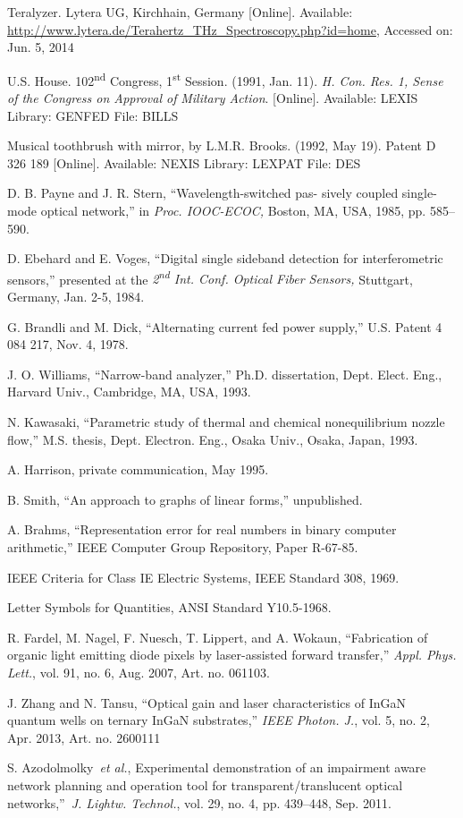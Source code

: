 \documentclass{ieeeaccess}
\begin{document}
\begin{thebibliography}{00}
 Teralyzer. Lytera UG, Kirchhain, Germany [Online].
Available:
\underline{http://www.lytera.de/Terahertz\_THz\_Spectroscopy.php?id=home}, Accessed on: Jun. 5, 2014

 U.S. House. 102\textsuperscript{nd} Congress, 1\textsuperscript{st} Session. (1991, Jan. 11). \emph{H. Con. Res. 1, Sense of the Congress on Approval of}  \emph{Military Action}. [Online]. Available: LEXIS Library: GENFED File: BILLS

 Musical toothbrush with mirror, by L.M.R. Brooks. (1992, May 19). Patent D 326 189 [Online]. Available: NEXIS Library: LEXPAT File: DES

 D. B. Payne and J. R. Stern, ``Wavelength-switched pas- sively coupled single-mode optical network,'' in \emph{Proc. IOOC-ECOC,} Boston, MA, USA, 1985, pp. 585--590.

 D. Ebehard and E. Voges, ``Digital single sideband detection for interferometric sensors,'' presented at the \emph{2\textsuperscript{nd} Int. Conf. Optical Fiber Sensors,} Stuttgart, Germany, Jan. 2-5, 1984.

 G. Brandli and M. Dick, ``Alternating current fed power supply,'' U.S. Patent 4 084 217, Nov. 4, 1978.

 J. O. Williams, ``Narrow-band analyzer,'' Ph.D. dissertation, Dept. Elect. Eng., Harvard Univ., Cambridge, MA, USA, 1993.

 N. Kawasaki, ``Parametric study of thermal and chemical nonequilibrium nozzle flow,'' M.S. thesis, Dept. Electron. Eng., Osaka Univ., Osaka, Japan, 1993.

 A. Harrison, private communication, May 1995.

 B. Smith, ``An approach to graphs of linear forms,'' unpublished.

 A. Brahms, ``Representation error for real numbers in binary computer arithmetic,'' IEEE Computer Group Repository, Paper R-67-85.

 IEEE Criteria for Class IE Electric Systems, IEEE Standard 308, 1969.

 Letter Symbols for Quantities, ANSI Standard Y10.5-1968.

 R. Fardel, M. Nagel, F. Nuesch, T. Lippert, and A. Wokaun, ``Fabrication of organic light emitting diode pixels by laser-assisted forward transfer,'' \emph{Appl. Phys. Lett.}, vol. 91, no. 6, Aug. 2007, Art. no. 061103.~

 J. Zhang and N. Tansu, ``Optical gain and laser characteristics of InGaN quantum wells on ternary InGaN substrates,'' \emph{IEEE Photon. J.}, vol. 5, no. 2, Apr. 2013, Art. no. 2600111

 S. Azodolmolky~\emph{et al.}, Experimental demonstration of an impairment aware network planning and operation tool for transparent/translucent optical networks,''~\emph{J. Lightw. Technol.}, vol. 29, no. 4, pp. 439--448, Sep. 2011.

\end{thebibliography}
\end{document}

